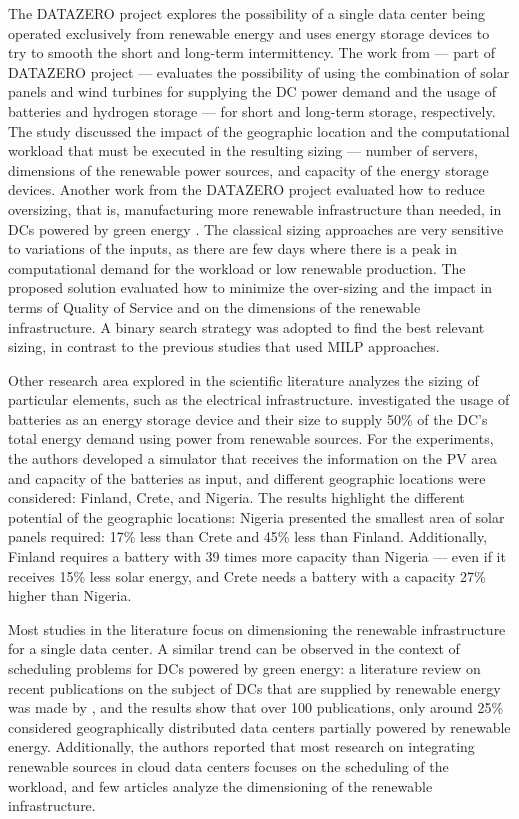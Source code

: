 The DATAZERO \citep{datazero} project explores the possibility of a single data center being operated exclusively from renewable energy and uses energy storage devices to try to smooth the short and long-term intermittency. The work from \citet{HADDAD2021100505} --- part of DATAZERO project --- evaluates the possibility of using the combination of solar panels and wind turbines for supplying the DC power demand and the usage of batteries and hydrogen storage --- for short and long-term storage, respectively. The study discussed the impact of the geographic location and the computational workload that must be executed in the resulting sizing --- number of servers, dimensions of the renewable power sources, and capacity of the energy storage devices. Another work from the DATAZERO project evaluated how to reduce oversizing, that is, manufacturing more renewable infrastructure than needed, in DCs powered by green energy \citep{manal2022}. The classical sizing approaches are very sensitive to variations of the inputs, as there are few days where there is a peak in computational demand for the workload or low renewable production. The proposed solution evaluated how to minimize the over-sizing and the impact in terms of Quality of Service and on the dimensions of the renewable infrastructure. A binary search strategy was adopted to find the best relevant sizing, in contrast to the previous studies that used MILP approaches.


Other research area explored in the scientific literature analyzes the sizing of particular elements, such as the electrical infrastructure. \citet{sheme2018_batsize} investigated the usage of batteries as an energy storage device and their size to supply 50\% of the DC's total energy demand using power from renewable sources. For the experiments, the authors developed a simulator that receives the information on the PV area and capacity of the batteries as input, and different geographic locations were considered: Finland, Crete, and Nigeria. The results highlight the different potential of the geographic locations: Nigeria presented the smallest area of solar panels required: 17\% less than Crete and 45\% less than Finland. Additionally, Finland requires a battery with 39 times more capacity than Nigeria --- even if it receives 15\% less solar energy, and Crete needs a battery with a capacity 27\% higher than Nigeria.


Most studies in the literature focus on dimensioning the renewable infrastructure for a single data center. A similar trend can be observed in the context of scheduling problems for DCs powered by green energy:  a literature review on recent publications on the subject of DCs that are supplied by renewable energy was made by \citet{SONG2022326}, and the results show that over 100 publications, only around 25\% considered geographically distributed data centers partially powered by renewable energy. Additionally, the authors reported that most research on integrating renewable sources in cloud data centers focuses on the scheduling of the workload, and few articles analyze the dimensioning of the renewable infrastructure.


